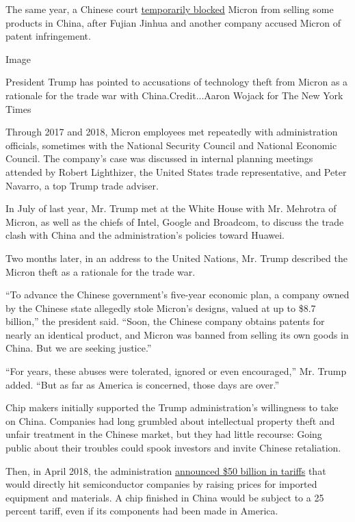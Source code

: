 The same year, a Chinese court
\href{https://www.reuters.com/article/us-micron-tech-stocks/china-court-bans-micron-chip-sales-in-patent-case-taiwans-umc-idUSKBN1JT2DL}{temporarily
blocked} Micron from selling some products in China, after Fujian Jinhua
and another company accused Micron of patent infringement.

Image

President Trump has pointed to accusations of technology theft from
Micron as a rationale for the trade war with China.Credit...Aaron Wojack
for The New York Times

Through 2017 and 2018, Micron employees met repeatedly with
administration officials, sometimes with the National Security Council
and National Economic Council. The company's case was discussed in
internal planning meetings attended by Robert Lighthizer, the United
States trade representative, and Peter Navarro, a top Trump trade
adviser.

In July of last year, Mr. Trump met at the White House with Mr. Mehrotra
of Micron, as well as the chiefs of Intel, Google and Broadcom, to
discuss the trade clash with China and the administration's policies
toward Huawei.

Two months later, in an address to the United Nations, Mr. Trump
described the Micron theft as a rationale for the trade war.

``To advance the Chinese government's five-year economic plan, a company
owned by the Chinese state allegedly stole Micron's designs, valued at
up to \$8.7 billion,'' the president said. ``Soon, the Chinese company
obtains patents for nearly an identical product, and Micron was banned
from selling its own goods in China. But we are seeking justice.''

``For years, these abuses were tolerated, ignored or even encouraged,''
Mr. Trump added. ``But as far as America is concerned, those days are
over.''

Chip makers initially supported the Trump administration's willingness
to take on China. Companies had long grumbled about intellectual
property theft and unfair treatment in the Chinese market, but they had
little recourse: Going public about their troubles could spook investors
and invite Chinese retaliation.

Then, in April 2018, the administration
\href{https://www.nytimes.com/2018/04/03/us/politics/white-house-chinese-imports-tariffs.html}{announced
\$50 billion in tariffs} that would directly hit semiconductor companies
by raising prices for imported equipment and materials. A chip finished
in China would be subject to a 25 percent tariff, even if its components
had been made in America.

